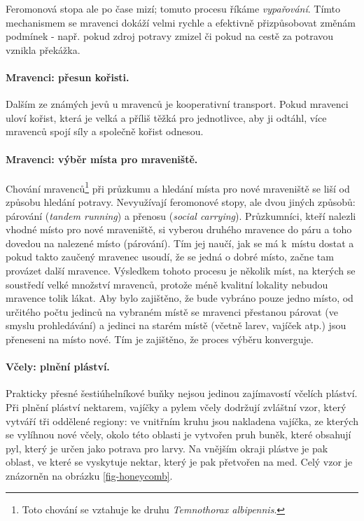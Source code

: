 \documentclass[a4paper,12pt]{article}
\begin{document}
Feromonová stopa ale po čase mizí; tomuto procesu říkáme {\it vypařování}. Tímto mechanismem se
mravenci dokáží velmi rychle a efektivně přizpůsobovat změnám podmínek - např. pokud zdroj
potravy zmizel či pokud na cestě za potravou vznikla překážka.

\paragraph{Mravenci: přesun kořisti.}
Dalším ze známých jevů u mravenců je kooperativní transport. Pokud mravenci uloví kořist, která
je velká a příliš těžká pro jednotlivce, aby ji odtáhl, více mravenců spojí síly a společně
kořist odnesou.

\paragraph{Mravenci: výběr místa pro mraveniště.}
Chování mravenců\footnote{Toto chování se vztahuje ke druhu {\it Temnothorax albipennis}.} při
průzkumu a hledání místa pro nové mraveniště se liší od způsobu hledání potravy. Nevyužívají
feromonové stopy, ale dvou jiných způsobů: párování ({\it tandem running}) a přenosu ({\it social
carrying}). Průzkumníci, kteří nalezli vhodné místo pro nové mraveniště, si vyberou druhého
mravence do páru a toho dovedou na nalezené místo (párování). Tím jej naučí, jak se má k~místu
dostat a pokud takto zaučený mravenec usoudí, že se jedná o dobré místo, začne tam provázet
další mravence. Výsledkem tohoto procesu je několik míst, na kterých se soustředí velké množství
mravenců, protože méně kvalitní lokality nebudou mravence tolik lákat. Aby bylo zajištěno,
že bude vybráno pouze jedno místo, od určitého počtu jedinců na vybraném místě se mravenci
přestanou párovat (ve smyslu prohledávání) a jedinci na starém místě (včetně larev, vajíček atp.)
jsou přeneseni na místo nové. Tím je zajištěno, že proces výběru konverguje.

\paragraph{Včely: plnění pláství.}
Prakticky přesné šestiúhelníkové buňky nejsou jedinou zajímavostí včelích pláství. Při plnění
pláství nektarem, vajíčky a pylem včely dodržují zvláštní vzor, který vytváří tři oddělené
regiony: ve vnitřním kruhu jsou nakladena vajíčka, ze kterých se vylíhnou nové včely, okolo
této oblasti je vytvořen pruh buněk, které obsahují pyl, který je určen jako potrava pro larvy.
Na vnějším okraji plástve je pak oblast, ve které se vyskytuje nektar, který je pak přetvořen
na med. Celý vzor je znázorněn na obrázku \ref{fig-honeycomb}.
\end{document}
